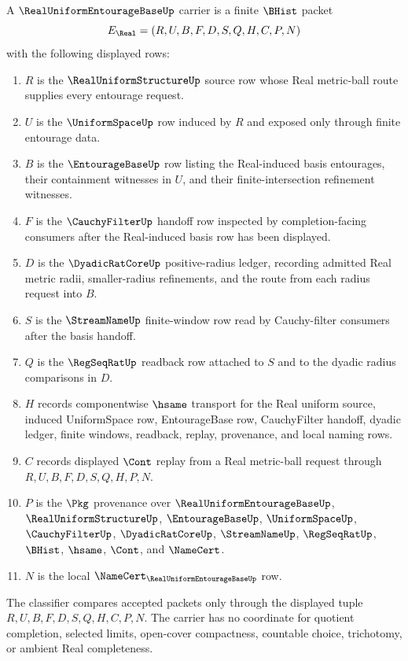 \begin{definition}
\label{def:real-uniform-entourage-base-carrier}
A $\RealUniformEntourageBaseUp$ carrier is a finite $\BHist$ packet
$$
E_{\Real}=(R,U,B,F,D,S,Q,H,C,P,N)
$$
with the following displayed rows:
\begin{enumerate}
\item $R$ is the $\RealUniformStructureUp$ source row whose Real metric-ball route supplies every entourage request.
\item $U$ is the $\UniformSpaceUp$ row induced by $R$ and exposed only through finite entourage data.
\item $B$ is the $\EntourageBaseUp$ row listing the Real-induced basis entourages, their containment witnesses in $U$, and their finite-intersection refinement witnesses.
\item $F$ is the $\CauchyFilterUp$ handoff row inspected by completion-facing consumers after the Real-induced basis row has been displayed.
\item $D$ is the $\DyadicRatCoreUp$ positive-radius ledger, recording admitted Real metric radii, smaller-radius refinements, and the route from each radius request into $B$.
\item $S$ is the $\StreamNameUp$ finite-window row read by Cauchy-filter consumers after the basis handoff.
\item $Q$ is the $\RegSeqRatUp$ readback row attached to $S$ and to the dyadic radius comparisons in $D$.
\item $H$ records componentwise $\hsame$ transport for the Real uniform source, induced UniformSpace row, EntourageBase row, CauchyFilter handoff, dyadic ledger, finite windows, readback, replay, provenance, and local naming rows.
\item $C$ records displayed $\Cont$ replay from a Real metric-ball request through $R,U,B,F,D,S,Q,H,P,N$.
\item $P$ is the $\Pkg$ provenance over $\RealUniformEntourageBaseUp$, $\RealUniformStructureUp$, $\EntourageBaseUp$, $\UniformSpaceUp$, $\CauchyFilterUp$, $\DyadicRatCoreUp$, $\StreamNameUp$, $\RegSeqRatUp$, $\BHist$, $\hsame$, $\Cont$, and $\NameCert$.
\item $N$ is the local $\NameCert_{\RealUniformEntourageBaseUp}$ row.
\end{enumerate}
The classifier compares accepted packets only through the displayed tuple $R,U,B,F,D,S,Q,H,C,P,N$. The carrier has no coordinate for quotient completion, selected limits, open-cover compactness, countable choice, trichotomy, or ambient Real completeness.
\end{definition}

